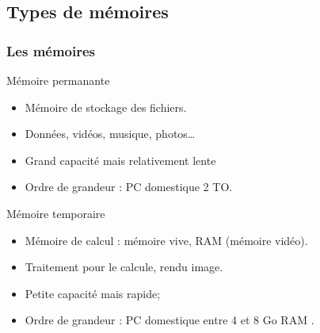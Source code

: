 \documentclass{beamer}
\begin{document}
	\subsection{Types de mémoires}
	\begin{frame}
		\frametitle{Les mémoires}
		\begin{block}{Mémoire permanante}
			\begin{itemize}
				\item Mémoire de stockage des fichiers.
				\item Données, vidéos, musique, photos\dots
				\item Grand capacité mais relativement lente
				\item Ordre de grandeur : PC domestique 2 TO.
			\end{itemize}
		\end{block}

		\begin{block}{Mémoire temporaire}
			\begin{itemize}
				\item Mémoire de calcul : mémoire vive, RAM (mémoire vidéo).
				\item Traitement pour le calcule, rendu image.
				\item Petite capacité mais rapide;
				\item Ordre de grandeur : PC domestique entre 4 et 8 Go RAM .
			\end{itemize}
		\end{block}

	\end{frame}
\end{document}
